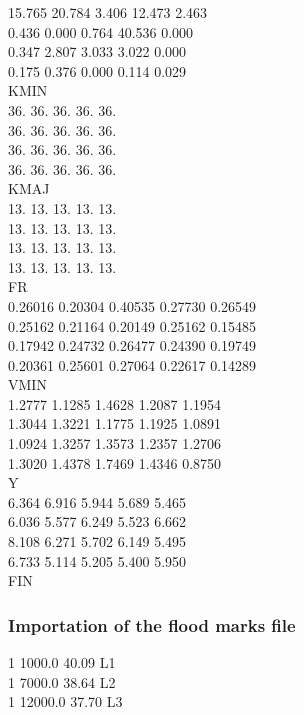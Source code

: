 \documentclass[a4paper,12pt]{article}
\begin{document}
       15.765       20.784        3.406       12.473        2.463\\
        0.436        0.000        0.764       40.536        0.000\\
        0.347        2.807        3.033        3.022        0.000\\
        0.175        0.376        0.000        0.114        0.029\\
 KMIN\\
          36.          36.          36.          36.          36.\\
          36.          36.          36.          36.          36.\\
          36.          36.          36.          36.          36.\\
          36.          36.          36.          36.          36.\\
 KMAJ\\
          13.          13.          13.          13.          13.\\
          13.          13.          13.          13.          13.\\
          13.          13.          13.          13.          13.\\
          13.          13.          13.          13.          13.\\
 FR\\
      0.26016      0.20304      0.40535      0.27730      0.26549\\
      0.25162      0.21164      0.20149      0.25162      0.15485\\
      0.17942      0.24732      0.26477      0.24390      0.19749\\
      0.20361      0.25601      0.27064      0.22617      0.14289\\
 VMIN\\
       1.2777       1.1285       1.4628       1.2087       1.1954\\
       1.3044       1.3221       1.1775       1.1925       1.0891\\
       1.0924       1.3257       1.3573       1.2357       1.2706\\
       1.3020       1.4378       1.7469       1.4346       0.8750\\
 Y\\
        6.364        6.916        5.944        5.689        5.465\\
        6.036        5.577        6.249        5.523        6.662\\
        8.108        6.271        5.702        6.149        5.495\\
        6.733        5.114        5.205        5.400        5.950\\
 FIN\\


\vspace{0.5cm}
\subsubsection{Importation of the flood marks file}


\vspace{0.5cm}

1      1000.0	40.09	  L1\\
1      7000.0	38.64	  L2\\
1     12000.0	37.70	  L3\\
\end{document}
